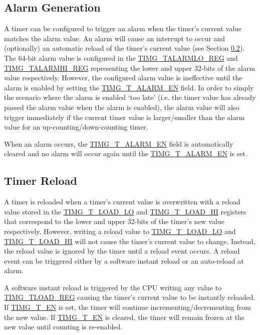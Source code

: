 \documentclass[main\_\_EN.tex]{subfiles}
\begin{document}
\subsection{Alarm Generation}
A timer can be configured to trigger an alarm when the timer's current value matches the alarm value. An alarm will cause an interrupt to occur and (optionally) an automatic reload of the timer's current value (see Section \ref{Timer_Reload}).
The 64-bit alarm value is configured in the \hyperref[regdesc:TIMGTXALARMLOREG]{TIMG\_TALARMLO\_REG} and \hyperref[regdesc:TIMGTXALARMHIREG]{TIMG\_TALARMHI\_REG}
representing the lower and upper 32-bits of the alarm value respectively. However, the configured alarm value is ineffective until the alarm is enabled by setting the \hyperref[fielddesc:TIMGTXALARMEN]{TIMG\_T\_ALARM\_EN} field. In order to simply the scenario where the alarm is enabled `too late' (i.e. the timer value has already passed the alarm value when the alarm is enabled), the alarm value will also trigger immediately if the current timer value is larger/smaller than the alarm value for an up-counting/down-counting timer.

When an alarm occurs, the \hyperref[fielddesc:TIMGTXALARMEN]{TIMG\_T\_ALARM\_EN} field is automatically cleared and no alarm will occur again until the \hyperref[fielddesc:TIMGTXALARMEN]{TIMG\_T\_ALARM\_EN} is set.

\subsection{Timer Reload} \label{Timer_Reload}
A timer is reloaded when a timer's current value is overwritten with a reload value stored in the \hyperref[fielddesc:TIMGTXLOADLO]{TIMG\_T\_LOAD\_LO} and \hyperref[fielddesc:TIMGTXLOADHI]{TIMG\_T\_LOAD\_HI} registers that correspond to the lower and upper 32-bits of the timer's new value respectively. However, writing a reload value to \hyperref[fielddesc:TIMGTXLOADLO]{TIMG\_T\_LOAD\_LO} and \hyperref[fielddesc:TIMGTXLOADHI]{TIMG\_T\_LOAD\_HI} will not cause the timer's current value to change. Instead, the reload value is ignored by the timer until a reload event occurs. A reload event can be triggered either by a software instant reload or an auto-reload at alarm.

A software instant reload is triggered by the CPU writing any value to \hyperref[regdesc:TIMGTXLOADREG]{TIMG\_TLOAD\_REG} causing the timer's current value to be instantly reloaded. If \hyperref[fielddesc:TIMGTXEN]{TIMG\_T\_EN} is set, the timer will continue incrementing/decrementing from the new value. If \hyperref[fielddesc:TIMGTXEN]{TIMG\_T\_EN} is cleared, the timer will remain frozen at the new value until counting is re-enabled.
\end{document}
